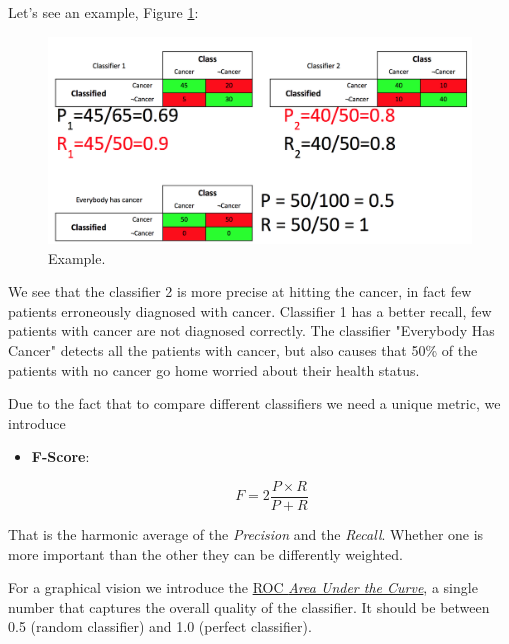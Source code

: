 Let's see an example, Figure \ref{pic:example}:

\begin{figure}[H]%
 \centering
 \includegraphics[width=13cm]{./img/08/example}
 \caption{\label{pic:example} Example.}
\end{figure}

We see that the classifier 2 is more precise at hitting the cancer, in fact few patients erroneously diagnosed with cancer. Classifier 1 has a better recall, few patients with cancer are not diagnosed correctly. 
The classifier "Everybody Has Cancer" detects all the patients with cancer, but also causes that 50\% of the patients with no cancer go home worried about their health status.

Due to the fact that to compare different classifiers we need a unique metric, we introduce

\begin{itemize}
\item \textbf{F-Score}: 

$$F = 2 \frac{P \times R}{P + R}$$
\end{itemize}

That is the harmonic average of the \emph{Precision} and the \emph{Recall}. Whether one is more important than the other  they can be differently weighted.


For a graphical vision we introduce the \href{https://en.wikipedia.org/wiki/Receiver_operating_characteristic}{ROC \emph{Area Under the Curve}}, a single number that captures the overall quality of the classifier. It should be between 0.5 (random classifier) and 1.0 (perfect classifier). 

